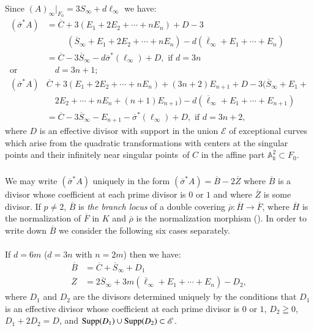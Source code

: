 \subsubsection{}\label{chap3:2.5.2}
Since $(A)_{\infty}|_{F_{0}}=3S_{\infty}+d\ell_{\infty}$ we have:
\begin{align*}
(\overline{\sigma}^{\ast}A) &=
  \overline{C}+3(E_{1}+2E_{2}+\cdots+nE_{n})+D-3\\ 
  & \hspace{1cm}(\overline{S}_{\infty}+E_{1}+2E_{2}+\cdots+nE_{n})
 -d(\overline{\ell}_{\infty}+E_{1}+\cdots+E_{n})\\
 & =\overline{C}-3\overline{S}_{\infty} - d \overline{\sigma}^{\ast}
 (\ell_{\infty})+D, \text{ \ if \ } d=3n\\ 
\text{or} &\quad d=3n+1;\\
(\overline{\sigma}^{\ast}A) & \overline{C}+3(E_{1}+2E_{2}+\cdots+nE_{n})+(3n+2)E_{n+1}+D-3(\overline{S}_{\infty}+E_{1}+\\
&\quad 2E_{2}+\cdots+nE_{n}+(n+1)E_{n+1})-d(\overline{\ell}_{\infty}+E_{1}+\cdots+E_{n+1})\\
&= \overline{C}-3\overline{S}_{\infty}-E_{n+1}-\overline{\sigma}^{\ast}(\ell_{\infty})+D,\text{ if } d=3n+2,
\end{align*}
where $D$ is an effective divisor with support in the union
$\mathscr{E}$ of exceptional curves which arise from the quadratic
transformations with centers at the singular points and their
infinitely near singular points\pageoriginale\ of $C$ in the affine
part $\mathbb{A}^{2}_{k}\subset F_{0}$.

\subsubsection{}\label{chap3:2.5.3}
We may write $(\overline{\sigma}^{\ast}A)$ uniquely in the form
$(\overline{\sigma}^{\ast}A)=\overline{B}-2\overline{Z}$ where
$\overline{B}$ is a divisor whose coefficient at each prime divisor is
$0$ or $1$ and where $\overline{Z}$ is some divisor. If $p\neq 2$,
$\overline{B}$ is {\em the branch locus} of a double covering
$\overline{\rho}:\overline{H}\to \overline{F}$, where $\overline{H}$
is the normalization of $\overline{F}$  in $K$ and $\overline{\rho}$
is the normalization morphism (\cf \cite{4}). In order to write down
$\overline{B}$ we consider the following six cases separately.

\paragraph{}\label{chap3:2.5.3.1}
If $d=6m$ (\iec $d=3n$ with $n=2m$) then we have:
\begin{align*}
\overline{B} &= \overline{C}+\overline{S}_{\infty}+D_{1}\\
\overline{Z} &=
2\overline{S}_{\infty}+3m(\overline{\ell}_{\infty}+E_{1}+\cdots+E_{n})-D_{2}, 
\end{align*}
where $D_{1}$ and $D_{2}$ are the divisors determined uniquely by the
conditions that $D_{1}$ is an effective divisor whose coefficient at
each prime divisor is $0$ or $1$, $D_{2}\geqq 0$, $D_{1}+2D_{2}=D$,
and $\operatorname{Supp}(D_{1})\cup \operatorname{Supp}(D_{2})\subset \mathscr{E}$.

